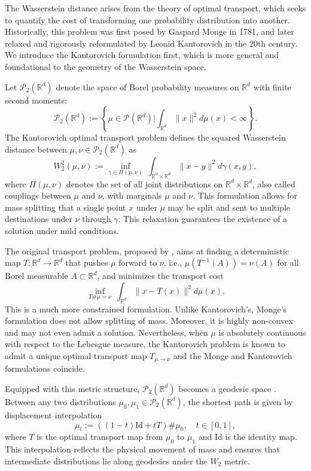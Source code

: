 \documentclass[11pt]{article}
\newcommand{\bbR}{\mathbb{R}}
\newcommand{\calP}{\mathcal{P}}
\begin{document}
The Wasserstein distance arises from the theory of optimal transport, which seeks to quantify the cost of transforming one probability distribution into another. Historically, this problem was first posed by Gaspard Monge in 1781, and later relaxed and rigorously reformulated by Leonid Kantorovich in the 20th century. We introduce the Kantorovich formulation first, which is more general and foundational to the geometry of the Wasserstein space.

Let $\calP_2(\bbR^d)$ denote the space of Borel probability measures on $\bbR^d$ with finite second moments:
\begin{equation*}
    \calP_2(\bbR^d) := \left\lbrace \mu \in \calP(\bbR^d) \bigg\vert \int_{\bbR^d} \|x\|^2 d\mu(x) < \infty\right\rbrace.
\end{equation*}
The Kantorovich optimal transport problem defines the squared Wasserstein distance between $\mu,\nu \in \calP_2(\bbR^d)$ as
\begin{equation*}
    W_2^2 (\mu, \nu)  := 
    \underset{\gamma \in \Pi(\mu,\nu)}{\inf}~ \int_{\bbR^d \times \bbR^d} \|x-y\|^2 d\gamma(x,y)
    ,
\end{equation*}
where $\Pi(\mu,\nu)$ denotes the set of all joint distributions on $\bbR^d \times \bbR^d$, also called couplings between $\mu$ and $\nu$, with marginals $\mu$ and $\nu$. This formulation allows for mass splitting that a single point $x$ under $\mu$ may be split and sent to multiple destinations under $\nu$ through $\gamma$. This relaxation guarantees the existence of a solution under mild conditions.

The original transport problem, proposed by \cite{monge_1781_MemoireTheorieDeblais}, aims at finding a deterministic map $T:\bbR^d \to \bbR^d$ that pushes $\mu$ forward to $\nu$, i.e., $\mu(T^{-1}(A)) = \nu(A)$ for all Borel measurable $A \subset \bbR^d$, and minimizes the transport cost 
\begin{equation*}
    \inf_{T{\#} \mu = \nu}~ \int_{\bbR^d} \|x-T(x)\|^2 d\mu(x).
\end{equation*}
This is a much more constrained formulation. Unlike Kantorovich's, Monge's formulation does not allow splitting of mass. Moreover, it is highly non-convex and may not even admit a solution. Nevertheless, when $\mu$ is absolutely continuous with respect to the Lebesgue measure, the Kantorovich problem is known to admit a unique optimal transport map $T_{\mu \to \nu}$ and the Monge and Kantorovich formulations coincide. 

Equipped with this metric structure, $\calP_2(\bbR^d)$ becomes a geodesic space \citep{burago_2001_CourseMetricGeometry}. Between any two distributions $\mu_0, \mu_1 \in \calP_2(\bbR^d)$, the shortest path is given by displacement interpolation \citep{mccann_1997_ConvexityPrincipleInteracting}
\begin{equation*}
    \mu_t := ((1-t)\text{Id} + tT)\#\mu_0,\quad t\in [0,1],
\end{equation*}
where $T$ is the optimal transport map from $\mu_0$ to $\mu_1$ and $\text{Id}$ is the identity map. This interpolation reflects the physical movement of mass and ensures that intermediate distributions lie along geodesics under the $W_2$ metric.
\end{document}
